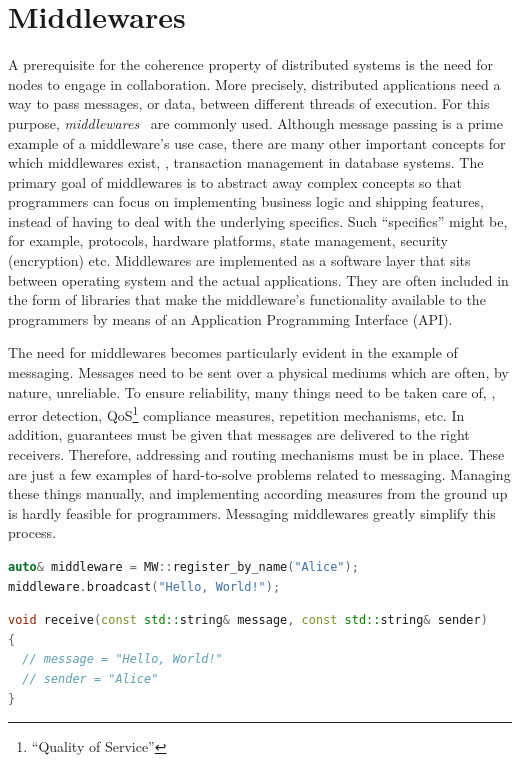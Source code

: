 \section{Middlewares} \label{sec:middlewares}
A prerequisite for the coherence property of distributed systems is the need for nodes to engage in collaboration. More precisely, distributed applications need a way to pass messages, or data, between different threads of execution. For this purpose, \emph{middlewares}~\cite{bernstein1996middleware} are commonly used. Although message passing is a prime example of a middleware's use case, there are many other important concepts for which middlewares exist, \eg , transaction management in database systems. The primary goal of middlewares is to abstract away complex concepts so that programmers can focus on implementing business logic and shipping features, instead of having to deal with the underlying specifics. Such ``specifics'' might be, for example, protocols, hardware platforms, state management, security (encryption) etc.
Middlewares are implemented as a software layer that sits between operating system and the actual applications. They are often included in the form of libraries that make the middleware's functionality available to the programmers by means of an Application Programming Interface (API).

The need for middlewares becomes particularly evident in the example of messaging. Messages need to be sent over a physical mediums which are often, by nature, unreliable. To ensure reliability, many things need to be taken care of, \eg , error detection, QoS\footnote{``Quality of Service''} compliance measures, repetition mechanisms, etc. In addition, guarantees must be given that messages are delivered to the right receivers. Therefore, addressing and routing mechanisms must be in place. These are just a few examples of hard-to-solve problems related to messaging. Managing these things manually, and implementing according measures from the ground up is hardly feasible for programmers. Messaging middlewares greatly simplify this process.

\begin{lstlisting}[caption={[Middleware send example]A code snippet demonstrating a broadcast dispatch via middleware}, label={lst:send}, language={C++}]
auto& middleware = MW::register_by_name("Alice");
middleware.broadcast("Hello, World!");
\end{lstlisting}

\begin{lstlisting}[caption={[Middleware receive example]An exemplary callback function to receive messages via middleware}, label={lst:receive}, language={C++}]
void receive(const std::string& message, const std::string& sender)
{
  // message = "Hello, World!"
  // sender = "Alice"
}
\end{lstlisting}

